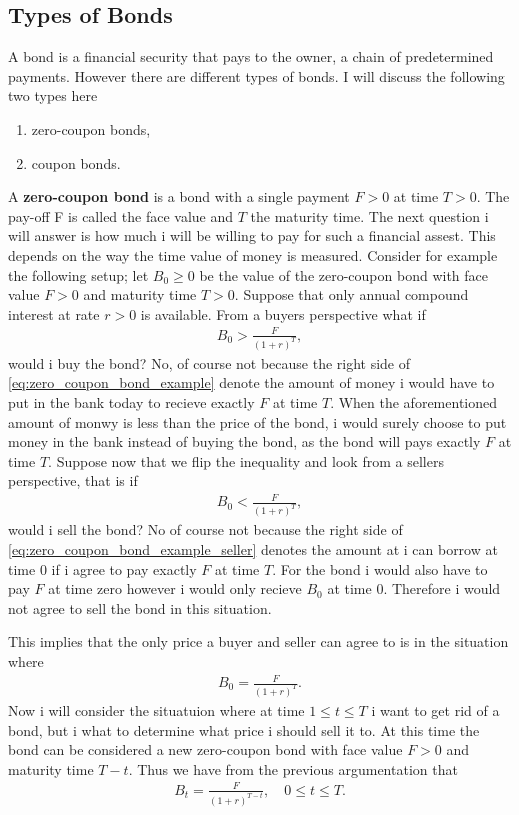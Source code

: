 \documentclass{article}
\theoremstyle{definition}
\numberwithin{equation}{section}
\begin{document}
\subsection{Types of Bonds}
A bond is a financial security that pays to the owner, a chain of predetermined payments.
However there are different types of bonds.
I will discuss the following two types here
\begin{enumerate}
    \item zero-coupon bonds,
    \item coupon bonds.
\end{enumerate}
A \textbf{zero-coupon bond} is a bond with a single payment $F > 0$ at time $T > 0$.
The pay-off F is called the face value and $T$ the maturity time.
The next question i will answer is how much i will be willing to pay for such a financial assest.
This depends on the way the time value of money is measured.
Consider for example the following setup; let $B_0 \geq 0$ be the value of the zero-coupon bond with face value $F>0$ and maturity time $T>0$.
Suppose that only annual compound interest at rate $r>0$ is available.
From a buyers perspective what if
\begin{align}\label{eq:zero_coupon_bond_example}
    B_0 > \frac{F}{(1 + r)^T},
\end{align}
would i buy the bond? 
No, of course not because the right side of \eqref{eq:zero_coupon_bond_example} denote the amount of money i would have to put in the bank today to recieve exactly $F$ at time $T$.
When the aforementioned amount of monwy is less than the price of the bond, i would surely choose to put money in the bank instead of buying the bond, as the bond will pays exactly $F$ at time $T$.
Suppose now that we flip the inequality and look from a sellers perspective, that is if
\begin{align}\label{eq:zero_coupon_bond_example_seller}
    B_0 < \frac{F}{(1 + r)^T},
\end{align}
would i sell the bond? 
No of course not because the right side of \eqref{eq:zero_coupon_bond_example_seller} denotes the amount at i can borrow at time 0 if i agree to pay exactly $F$ at time $T$.
For the bond i would also have to pay $F$ at time zero however i would only recieve $B_0$ at time 0.
Therefore i would not agree to sell the bond in this situation.

This implies that the only price a buyer and seller can agree to is in the situation where
\begin{align}
    B_0 = \frac{F}{(1 + r)^T}.
\end{align}
Now i will consider the situatuion where at time $1 \leq t \leq T$ i want to get rid of a bond, but i what to determine what price i should sell it to.
At this time the bond can be considered a new zero-coupon bond with face value $F > 0$ and maturity time $T - t$.
Thus we have from the previous argumentation that
\begin{align}
    B_t = \frac{F}{(1 + r)^{T - t}}, \quad 0 \leq t \leq T.
\end{align} 
\end{document}
